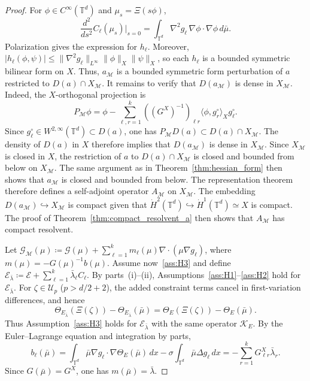\documentclass[11pt]{article}
\numberwithin{equation}{section}
\theoremstyle{definition}
\newcommand{\T}{\mathbb{T}}
\newcommand{\E}{\mathcal{E}}
\newcommand{\dotHk}[1][k]{\dot{H}^{#1}}
\begin{document}
\begin{proof}
    For $\phi \in C^{\infty}(\T^d)$ and $\mu_s = \Xi(s\phi)$,
    \[
    \frac{d^2}{ds^2} C_\ell(\mu_s)\Big|_{s=0} = \int_{\T^d}\nabla^2g_\ell\,\nabla\phi \cdot \nabla\phi \, d\bar\mu.
    \]
    Polarization gives the expression for $h_\ell$. Moreover, $|h_\ell(\phi,\psi)| \le \|\nabla^2g_\ell\|_{L^\infty} \|\phi\|_X \|\psi\|_X$, so each $h_\ell$ is a bounded symmetric bilinear form on $X$.
    Thus, $a_{\mathcal{M}}$ is a bounded symmetric form perturbation of $a$ restricted to $D(a) \cap X_{\mathcal{M}}$.
    It remains to verify that $D(a_{\mathcal{M}})$ is dense in $X_{\mathcal{M}}$.
    Indeed, the $X$-orthogonal projection is
    \[
    P_{\mathcal{M}}\phi = \phi - \sum_{\ell,r=1}^k ((G^X)^{-1})_{\ell r} \langle \phi,g_r^\circ \rangle_X g_\ell^\circ.
    \]
    Since $g_\ell^\circ \in W^{2,\infty}(\T^d) \subset D(a)$, one has $P_{\mathcal{M}}D(a) \subset D(a) \cap X_{\mathcal{M}}$. 
    The density of $D(a)$ in $X$ therefore implies that $D(a_{\mathcal{M}})$ is dense in $X_{\mathcal{M}}$.
    Since $X_{\mathcal{M}}$ is closed in $X$, the restriction of $a$ to $D(a) \cap X_{\mathcal{M}}$ is closed and bounded from below on $X_{\mathcal{M}}$.
    The same argument as in Theorem~\ref{thm:hessian_form} then shows that $a_{\mathcal{M}}$ is closed and bounded from below.
    The representation theorem therefore defines a self-adjoint operator $A_{\mathcal{M}}$ on $X_{\mathcal{M}}$.
    The embedding $D(a_{\mathcal{M}}) \hookrightarrow X_{\mathcal{M}}$ is compact given that $\dotHk[2](\T^d) \hookrightarrow \dotHk[1](\T^d) \simeq X$ is compact. 
    The proof of Theorem~\ref{thm:compact_resolvent_a} then shows that $A_{\mathcal{M}}$ has compact resolvent.

    Let $\mathcal{G}_{\mathcal{M}}(\mu) \coloneqq \mathcal{G}(\mu) + \sum_{\ell=1}^k m_\ell(\mu)\nabla\cdot(\mu\nabla g_\ell)$, where $m(\mu) = -G(\mu)^{-1}b(\mu)$.
    Assume now~\ref{ass:H3} and define $\E_{\bar\lambda} \coloneqq \E + \sum_{\ell=1}^k \bar\lambda_\ell C_\ell$.
    By parts~(i)--(ii), Assumptions~\ref{ass:H1}--\ref{ass:H2} hold for $\E_{\bar\lambda}$.
    For $\zeta \in \mathcal{U}_p$ ($p > d/2 + 2$), the added constraint terms cancel in first-variation differences, and hence
    \[
    \Theta_{E_{\bar\lambda}}(\Xi(\zeta)) - \Theta_{E_{\bar\lambda}}(\bar\mu) = \Theta_E(\Xi(\zeta)) - \Theta_E(\bar\mu).
    \]
    Thus Assumption~\ref{ass:H3} holds for $\E_{\bar\lambda}$ with the same operator $\mathcal{K}_E$.
    By the Euler--Lagrange equation and integration by parts,
    \[
    b_\ell(\bar\mu) = \int_{\T^d} \bar\mu \nabla g_\ell \cdot \nabla\Theta_E(\bar\mu) \, dx - \sigma\int_{\T^d} \bar\mu \Delta g_\ell \, dx = -\sum_{r=1}^k G^X_{\ell r} \bar\lambda_r.
    \]
    Since $G(\bar\mu) = G^X$, one has $m(\bar\mu) = \bar\lambda$.


\end{proof}
\end{document}
